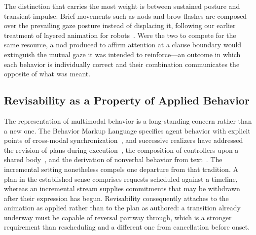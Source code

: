 The distinction that carries the most weight is between sustained posture and
transient impulse. Brief movements such as nods and brow flashes are composed
over the prevailing gaze posture instead of displacing it, following our
earlier treatment of layered animation for robots~\cite{ribeiro2019nutty}. Were
the two to compete for the same resource, a nod produced to affirm attention at
a clause boundary would extinguish the mutual gaze it was intended to
reinforce---an outcome in which each behavior is individually correct and their
combination communicates the opposite of what was meant.

\subsection{Revisability as a Property of Applied Behavior}

The representation of multimodal behavior is a long-standing concern rather
than a new one. The Behavior Markup Language specifies agent behavior with
explicit points of cross-modal synchronization~\cite{kopp2006bml}, and
successive realizers have addressed the revision of plans during
execution~\cite{welbergen2009elckerlyc}, the composition of controllers upon a
shared body~\cite{thiebaux2008smartbody}, and the derivation of nonverbal
behavior from text~\cite{cassell2004beat}. The incremental setting nonetheless
compels one departure from that tradition. A plan in the established sense
comprises requests scheduled against a timeline, whereas an incremental stream
supplies commitments that may be withdrawn after their expression has begun.
Revisability consequently attaches to the animation as applied rather than to
the plan as authored: a transition already underway must be capable of reversal
partway through, which is a stronger requirement than rescheduling and a
different one from cancellation before onset.

